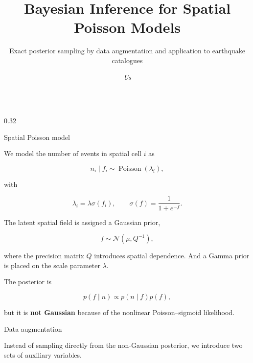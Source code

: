 \documentclass[final]{beamer}
\title{
Bayesian Inference for Spatial Poisson Models
}
\subtitle{
Exact posterior sampling by data augmentation and application to earthquake catalogues
}
\author{
 \textit{Us}
}
\institute{
    \textit{SFB1294 Autumn School 2026 Boltenhagen}
}
\newcommand{\sigmoid}{\sigma}
\begin{document}
\begin{frame}[t]

\vspace{0.2cm}

\begin{columns}[t,totalwidth=\textwidth]


\begin{column}{0.32\textwidth}

\begin{block}{Spatial Poisson model}

We model the number of events in spatial cell $i$ as

\[
n_i \mid f_i
\sim
\operatorname{Poisson}(\lambda_i),
\]

with

\[
\lambda_i
=
\lambda \sigmoid(f_i),
\qquad
\sigmoid(f)
=
\frac{1}{1+e^{-f}}.
\]

The latent spatial field is assigned a Gaussian prior,

\[
f \sim
\mathcal N(\mu,Q^{-1}),
\]

where the precision matrix $Q$ introduces spatial dependence. And a Gamma prior is placed on the scale parameter $\lambda$.

\vspace{0.3cm}

The posterior is

\[
p(f\mid n)
\propto
p(n\mid f)p(f),
\]

but it is \textbf{not Gaussian} because of the nonlinear
Poisson--sigmoid likelihood.

\end{block}


\begin{block}{Data augmentation}

Instead of sampling directly from the non-Gaussian posterior,
we introduce two sets of auxiliary variables.

\vspace{0.5cm}

\begin{center}


\end{center}
\end{block}
\end{column}
\end{columns}
\end{frame}
\end{document}
